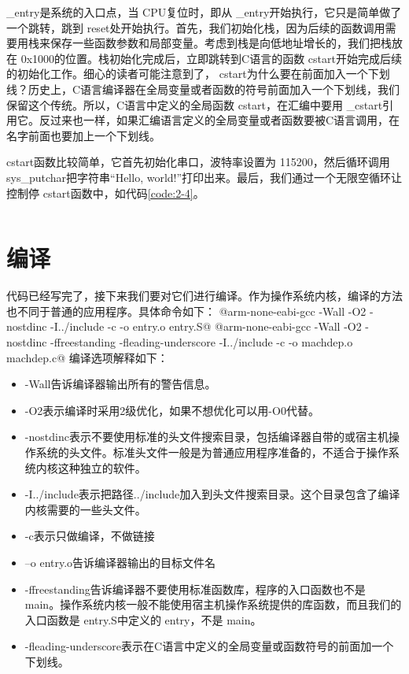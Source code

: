 \documentclass[main.tex]{subfiles}
\begin{document}
\begin{CJK*}{UTF8}{song}
\begin{code}
\label{code:2-3}
\inputminted[linenos,numbersep=5pt,frame=lines,framesep=2mm]{gas}{src/chapter02/kernel/entry.S}
\end{code}

 \_entry是系统的入口点，当 CPU复位时，即从 \_entry开始执行，它只是简单做了一个跳转，跳到 reset处开始执行。首先，我们初始化栈，因为后续的函数调用需要用栈来保存一些函数参数和局部变量。考虑到栈是向低地址增长的，我们把栈放在 0x1000的位置。栈初始化完成后，立即跳转到C语言的函数 cstart开始完成后续的初始化工作。细心的读者可能注意到了， cstart为什么要在前面加入一个下划线？历史上，C语言编译器在全局变量或者函数的符号前面加入一个下划线，我们保留这个传统。所以，C语言中定义的全局函数 cstart，在汇编中要用 \_cstart引用它。反过来也一样，如果汇编语言定义的全局变量或者函数要被C语言调用，在名字前面也要加上一个下划线。

\par
cstart函数比较简单，它首先初始化串口，波特率设置为 115200，然后循环调用 sys\_\-putchar把字符串“Hello, world!”打印出来。最后，我们通过一个无限空循环让控制停 cstart函数中，如代码\ref{code:2-4}。

\begin{code}
\label{code:2-4}
\inputminted[firstline=50,lastline=61,linenos,numbersep=5pt,frame=lines,framesep=2mm]{c}{src/chapter02/kernel/machdep.c}
\end{code}


\section{编译}
代码已经写完了，接下来我们要对它们进行编译。作为操作系统内核，编译的方法也不同于普通的应用程序。具体命令如下：
@arm-none-eabi-gcc -Wall -O2 -nostdinc -I../include -c -o entry.o entry.S@
@arm-none-eabi-gcc -Wall -O2 -nostdinc -ffreestanding -fleading-underscore -I../include -c -o machdep.o machdep.c@
\noindent
编译选项解释如下：
\begin{itemize}
	\item -Wall告诉编译器输出所有的警告信息。
	\item -O2表示编译时采用2级优化，如果不想优化可以用-O0代替。
	\item -nostdinc表示不要使用标准的头文件搜索目录，包括编译器自带的或宿主机操作系统的头文件。标准头文件一般是为普通应用程序准备的，不适合于操作系统内核这种独立的软件。
	\item -I../include表示把路径../include加入到头文件搜索目录。这个目录包含了编译内核需要的一些头文件。
	\item -c表示只做编译，不做链接
	\item –o entry.o告诉编译器输出的目标文件名
	\item -ffreestanding告诉编译器不要使用标准函数库，程序的入口函数也不是 main。操作系统内核一般不能使用宿主机操作系统提供的库函数，而且我们的入口函数是 entry.S中定义的 entry，不是 main。
	\item -fleading-underscore表示在C语言中定义的全局变量或函数符号的前面加一个下划线。
\end{itemize}


\end{CJK*}
\end{document}
